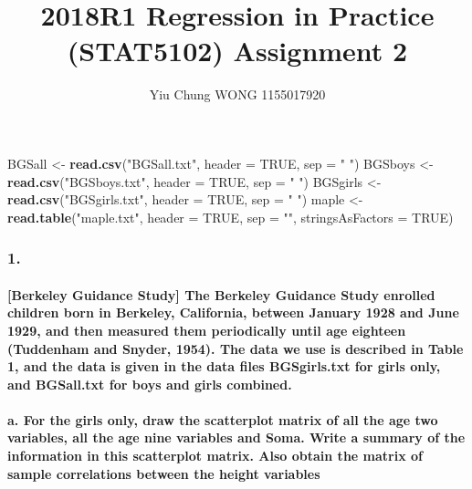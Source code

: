 \documentclass[]{article}
\title{2018R1 Regression in Practice (STAT5102) Assignment 2}
\author{Yiu Chung WONG 1155017920}
\date{}
\newenvironment{Shaded}{\begin{snugshade}}{\end{snugshade}}
\newcommand{\KeywordTok}[1]{\textcolor[rgb]{0.13,0.29,0.53}{\textbf{#1}}}
\newcommand{\DataTypeTok}[1]{\textcolor[rgb]{0.13,0.29,0.53}{#1}}
\newcommand{\StringTok}[1]{\textcolor[rgb]{0.31,0.60,0.02}{#1}}
\newcommand{\OtherTok}[1]{\textcolor[rgb]{0.56,0.35,0.01}{#1}}
\newcommand{\NormalTok}[1]{#1}
\let\oldparagraph\paragraph
\renewcommand{\paragraph}[1]{\oldparagraph{#1}\mbox{}}
\begin{document}
\maketitle

\begin{Shaded}
\begin{Highlighting}[]
\NormalTok{BGSall <-}\StringTok{ }\KeywordTok{read.csv}\NormalTok{(}\StringTok{"BGSall.txt"}\NormalTok{, }\DataTypeTok{header =} \OtherTok{TRUE}\NormalTok{, }\DataTypeTok{sep =} \StringTok{" "}\NormalTok{)}
\NormalTok{BGSboys <-}\StringTok{ }\KeywordTok{read.csv}\NormalTok{(}\StringTok{"BGSboys.txt"}\NormalTok{, }\DataTypeTok{header =} \OtherTok{TRUE}\NormalTok{, }\DataTypeTok{sep =} \StringTok{" "}\NormalTok{)}
\NormalTok{BGSgirls <-}\StringTok{ }\KeywordTok{read.csv}\NormalTok{(}\StringTok{"BGSgirls.txt"}\NormalTok{, }\DataTypeTok{header =} \OtherTok{TRUE}\NormalTok{, }\DataTypeTok{sep =} \StringTok{" "}\NormalTok{)}
\NormalTok{maple <-}\StringTok{ }\KeywordTok{read.table}\NormalTok{(}\StringTok{"maple.txt"}\NormalTok{, }\DataTypeTok{header =} \OtherTok{TRUE}\NormalTok{, }\DataTypeTok{sep =} \StringTok{""}\NormalTok{, }\DataTypeTok{stringsAsFactors =} \OtherTok{TRUE}\NormalTok{)}
\end{Highlighting}
\end{Shaded}

\subsubsection{1.}\label{section}

\paragraph{{[}Berkeley Guidance Study{]} The Berkeley Guidance Study
enrolled children born in Berkeley, California, between January 1928 and
June 1929, and then measured them periodically until age eighteen
(Tuddenham and Snyder, 1954). The data we use is described in Table 1,
and the data is given in the data files BGSgirls.txt for girls only, and
BGSall.txt for boys and girls
combined.}\label{berkeley-guidance-study-the-berkeley-guidance-study-enrolled-children-born-in-berkeley-california-between-january-1928-and-june-1929-and-then-measured-them-periodically-until-age-eighteen-tuddenham-and-snyder-1954.-the-data-we-use-is-described-in-table-1-and-the-data-is-given-in-the-data-files-bgsgirls.txt-for-girls-only-and-bgsall.txt-for-boys-and-girls-combined.}

\paragraph{a. For the girls only, draw the scatterplot matrix of all the
age two variables, all the age nine variables and Soma. Write a summary
of the information in this scatterplot matrix. Also obtain the matrix of
sample correlations between the height
variables}\label{a.-for-the-girls-only-draw-the-scatterplot-matrix-of-all-the-age-two-variables-all-the-age-nine-variables-and-soma.-write-a-summary-of-the-information-in-this-scatterplot-matrix.-also-obtain-the-matrix-of-sample-correlations-between-the-height-variables}
\end{document}
